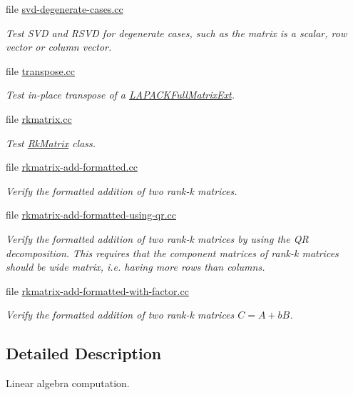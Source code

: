 \begin{DoxyCompactItemize}
file \hyperlink{svd-degenerate-cases_8cc}{svd-\/degenerate-\/cases.\+cc}
\begin{DoxyCompactList}\small\item\em Test S\+VD and R\+S\+VD for degenerate cases, such as the matrix is a scalar, row vector or column vector. \end{DoxyCompactList}\item 
file \hyperlink{transpose_8cc}{transpose.\+cc}
\begin{DoxyCompactList}\small\item\em Test in-\/place transpose of a \hyperlink{classLAPACKFullMatrixExt}{L\+A\+P\+A\+C\+K\+Full\+Matrix\+Ext}. \end{DoxyCompactList}\item 
file \hyperlink{rkmatrix_8cc}{rkmatrix.\+cc}
\begin{DoxyCompactList}\small\item\em Test \hyperlink{classRkMatrix}{Rk\+Matrix} class. \end{DoxyCompactList}\item 
file \hyperlink{rkmatrix-add-formatted_8cc}{rkmatrix-\/add-\/formatted.\+cc}
\begin{DoxyCompactList}\small\item\em Verify the formatted addition of two rank-\/k matrices. \end{DoxyCompactList}\item 
file \hyperlink{rkmatrix-add-formatted-using-qr_8cc}{rkmatrix-\/add-\/formatted-\/using-\/qr.\+cc}
\begin{DoxyCompactList}\small\item\em Verify the formatted addition of two rank-\/k matrices by using the QR decomposition. This requires that the component matrices of rank-\/k matrices should be wide matrix, i.\+e. having more rows than columns. \end{DoxyCompactList}\item 
file \hyperlink{rkmatrix-add-formatted-with-factor_8cc}{rkmatrix-\/add-\/formatted-\/with-\/factor.\+cc}
\begin{DoxyCompactList}\small\item\em Verify the formatted addition of two rank-\/k matrices $C = A + b B$. \end{DoxyCompactList}\end{DoxyCompactItemize}


\subsection{Detailed Description}
Linear algebra computation. 

